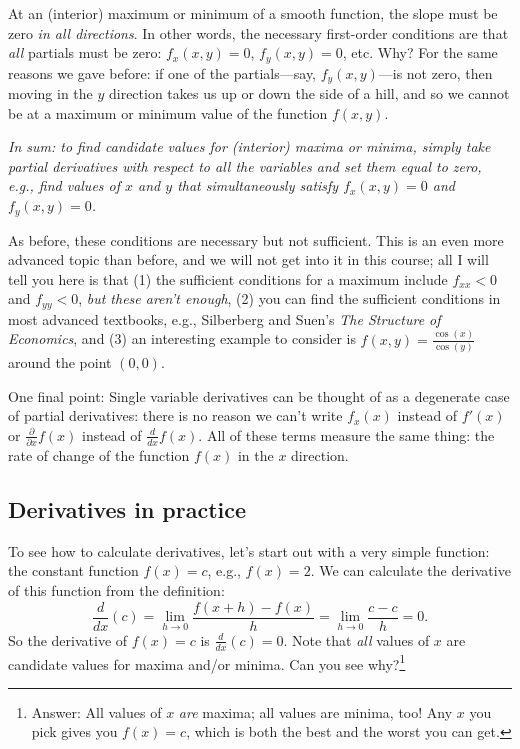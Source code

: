 \begin{CALCULUS}
At an (interior) maximum or minimum of a smooth function, the slope must be zero \emph{in all directions}. In other words, the necessary first-order conditions are that \emph{all} partials must be zero: $f_x(x,y)=0$, $f_y(x,y)=0$, etc. Why? For the same reasons we gave before: if one of the partials---say, $f_y(x,y)$---is not zero, then moving in the $y$ direction takes us up or down the side of a hill, and so we cannot be at a maximum or minimum value of the function $f(x,y)$.

\bigskip

\noindent \emph{In sum: to find candidate values for (interior) maxima or minima, simply take partial derivatives with respect to all the variables and set them equal to zero, e.g., find values of $x$ and $y$ that simultaneously satisfy $f_x(x,y)=0$ \emph{and} $f_y(x,y)=0$.}

\bigskip

As before, these conditions are necessary but not sufficient. This is an even more advanced topic than before, and we will not get into it in this course; all I will tell you here is that (1) the sufficient conditions for a maximum include $f_{xx}<0$ and $f_{yy}<0$, \emph{but these aren't enough}, (2) you can find the sufficient conditions in most advanced textbooks, e.g., Silberberg and Suen's \emph{The Structure of Economics}, and (3) an interesting example to consider is $\displaystyle f(x,y)=\frac{\cos(x)}{\cos(y)}$ around the point $(0,0)$.


One final point: Single variable derivatives can be thought of as a degenerate case of partial derivatives: there is no reason we can't write $f_x(x)$ instead of $f'(x)$ or $\displaystyle \frac{\partial}{\partial x} f(x)$ instead of $\displaystyle \frac{d}{dx} f(x)$. All of these terms measure the same thing: the rate of change of the function $f(x)$ in the $x$ direction.




\subsection*{Derivatives in practice}

To see how to calculate derivatives, let's start out with a very simple function: the constant function $f(x)=c$, e.g., $f(x)=2$. We can calculate the derivative of this function from the definition:
\[
\frac{d}{dx}(c) = \lim_{h\rightarrow 0} \frac{f(x+h) - f(x)}{h} = \lim_{h\rightarrow 0} \frac{c - c}{h} =0.
\]
So the derivative of $f(x)=c$ is $\displaystyle \frac{d}{dx}(c) = 0$. Note that \emph{all} values of $x$ are candidate values for maxima and/or minima. Can you see why?\footnote{Answer: All values of $x$ \emph{are} maxima; all values are minima, too! Any $x$ you pick gives you $f(x)=c$, which is both the best and the worst you can get.}


\end{CALCULUS}
